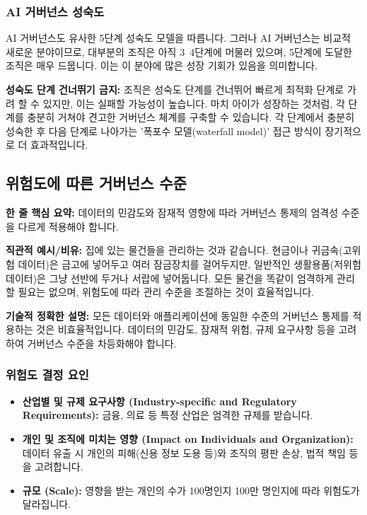 \documentclass[11pt,a4paper]{article}
\begin{document}
\subsubsection*{AI 거버넌스 성숙도}
AI 거버넌스도 유사한 5단계 성숙도 모델을 따릅니다. 그러나 AI 거버넌스는 비교적 새로운 분야이므로, 대부분의 조직은 아직 3~4단계에 머물러 있으며, 5단계에 도달한 조직은 매우 드뭅니다. 이는 이 분야에 많은 성장 기회가 있음을 의미합니다.

\begin{cautionbox}
\textbf{성숙도 단계 건너뛰기 금지:}
조직은 성숙도 단계를 건너뛰어 빠르게 최적화 단계로 가려 할 수 있지만, 이는 실패할 가능성이 높습니다. 마치 아이가 성장하는 것처럼, 각 단계를 충분히 거쳐야 견고한 거버넌스 체계를 구축할 수 있습니다. 각 단계에서 충분히 성숙한 후 다음 단계로 나아가는 '폭포수 모델(waterfall model)' 접근 방식이 장기적으로 더 효과적입니다.
\end{cautionbox}

\newpage
\subsection*{위험도에 따른 거버넌스 수준}

\begin{keyconceptbox}
\textbf{한 줄 핵심 요약:} 데이터의 민감도와 잠재적 영향에 따라 거버넌스 통제의 엄격성 수준을 다르게 적용해야 합니다.
\end{keyconceptbox}

\textbf{직관적 예시/비유:}
집에 있는 물건들을 관리하는 것과 같습니다. 현금이나 귀금속(고위험 데이터)은 금고에 넣어두고 여러 잠금장치를 걸어두지만, 일반적인 생활용품(저위험 데이터)은 그냥 선반에 두거나 서랍에 넣어둡니다. 모든 물건을 똑같이 엄격하게 관리할 필요는 없으며, 위험도에 따라 관리 수준을 조절하는 것이 효율적입니다.

\textbf{기술적 정확한 설명:}
모든 데이터와 애플리케이션에 동일한 수준의 거버넌스 통제를 적용하는 것은 비효율적입니다. 데이터의 민감도, 잠재적 위험, 규제 요구사항 등을 고려하여 거버넌스 수준을 차등화해야 합니다.

\subsubsection*{위험도 결정 요인}
\begin{itemize}
    \item \textbf{산업별 및 규제 요구사항 (Industry-specific and Regulatory Requirements):} 금융, 의료 등 특정 산업은 엄격한 규제를 받습니다.
    \item \textbf{개인 및 조직에 미치는 영향 (Impact on Individuals and Organization):} 데이터 유출 시 개인의 피해(신용 정보 도용 등)와 조직의 평판 손상, 법적 책임 등을 고려합니다.
    \item \textbf{규모 (Scale):} 영향을 받는 개인의 수가 100명인지 100만 명인지에 따라 위험도가 달라집니다.
\end{itemize}
\end{document}
